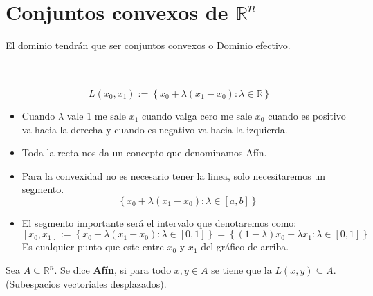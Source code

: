 \section{Conjuntos convexos de \boldmath $\mathbb{R}^n$}

El dominio tendrán que ser conjuntos convexos o Dominio efectivo.\\\\

\begin{def.}[Lineal]\,\\ 
$$L(x_0,x_1) := \left\{x_0+\lambda(x_1-x_0):\lambda \in \mathbb{R}\right\}$$

\begin{center}
\end{center}
\end{def.}

\begin{itemize}
    \item Cuando $\lambda$ vale $1$ me sale $x_1$ cuando valga cero me sale $x_0$ cuando es positivo va hacia la derecha y cuando es negativo va hacia la izquierda.
    \item Toda la recta nos da un concepto que denominamos Afín. 
    \item Para la convexidad no es necesario tener la linea, solo necesitaremos un segmento. 
	$$\left\{x_0+\lambda(x_1-x_0):\lambda \in \left[a,b\right]\right\}$$
    \item El segmento importante será el intervalo que denotaremos como:
	$$\left[x_0,x_1\right]:=\left\{x_0+\lambda(x_1-x_0):\lambda \in \left[0,1\right]\right\}=\left\{(1-\lambda)x_0+\lambda x_1:\lambda \in \left[0,1\right]\right\}$$
	Es cualquier punto que este entre $x_0$ y $x_1$ del gráfico de arriba. 
\end{itemize}


\begin{def.}
    Sea $A\subseteq \mathbb{R}^n$. Se dice \textbf{Afín}, si para todo $x, y\in A$ se tiene que la $L(x,y)\subseteq A$. (Subespacios vectoriales desplazados).
\end{def.}

